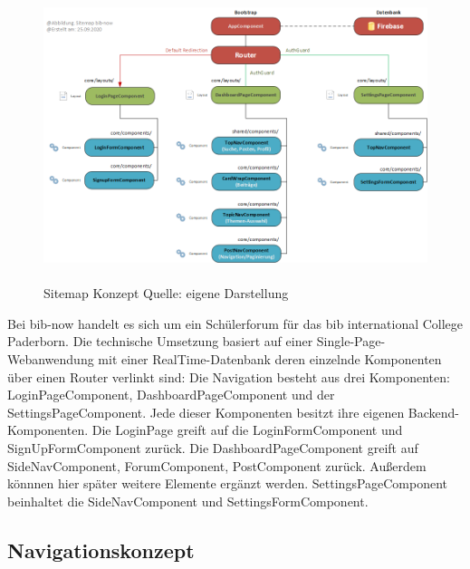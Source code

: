 \documentclass[12pt,titlepage]{article}
\begin{document}
\vspace{2cm}

\begin{figure}[hbt!]
 \centering
 \includegraphics[width=400pt]{abbildungen/Abbildung_Sitemap.png}
 \caption[Sitemap-Konzept]{\\Sitemap Konzept Quelle: eigene Darstellung}
\end{figure}


\vspace{2cm}

Bei bib-now handelt es sich um ein Schülerforum für das bib international College Paderborn. Die technische Umsetzung basiert auf  einer Single-Page-Webanwendung mit einer RealTime-Datenbank deren einzelnde Komponenten über einen Router verlinkt sind: Die Navigation besteht aus drei Komponenten: LoginPageComponent, DashboardPageComponent und der SettingsPageComponent. Jede dieser Komponenten besitzt ihre eigenen Backend-Komponenten. Die LoginPage greift auf die LoginFormComponent und SignUpFormComponent zurück. Die DashboardPageComponent greift auf  SideNavComponent, ForumComponent, PostComponent zurück. Außerdem könnnen hier später weitere Elemente ergänzt werden. SettingsPageComponent beinhaltet die SideNavComponent und SettingsFormComponent. 


\FloatBarrier

\subsection{Navigationskonzept}

\vspace{2cm}
\end{document}

